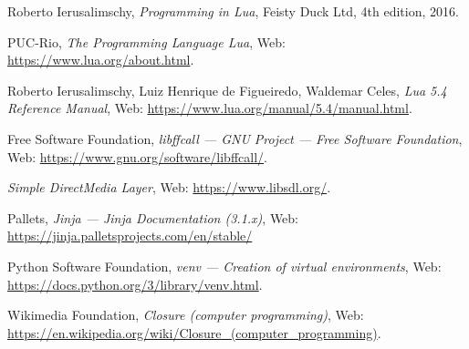 \documentclass[polish, english]{iithesis}
\begin{document}
\begin{thebibliography}{42}
    Roberto Ierusalimschy,
    \emph{Programming in Lua},
    Feisty Duck Ltd,
    4th edition,
    2016.

    PUC-Rio,
    \emph{The Programming Language Lua},
    Web: \url{https://www.lua.org/about.html}.

    Roberto Ierusalimschy, 
    Luiz Henrique de Figueiredo,
    Waldemar Celes,
    \emph{Lua 5.4 Reference Manual},
    Web: \url{https://www.lua.org/manual/5.4/manual.html}.

    Free Software Foundation,
    \emph{libffcall --- GNU Project --- Free Software Foundation},
    Web: \url{https://www.gnu.org/software/libffcall/}.

    \emph{Simple DirectMedia Layer},
    Web: \url{https://www.libsdl.org/}.

    Pallets,
    \emph{Jinja --- Jinja Documentation (3.1.x)},
    Web: \url{https://jinja.palletsprojects.com/en/stable/}

    Python Software Foundation,
    \emph{venv --- Creation of virtual environments},
    Web: \url{https://docs.python.org/3/library/venv.html}.

    Wikimedia Foundation,
    \emph{Closure (computer programming)},
    Web: \url{https://en.wikipedia.org/wiki/Closure_(computer_programming)}.
\end{thebibliography}
\end{document}
